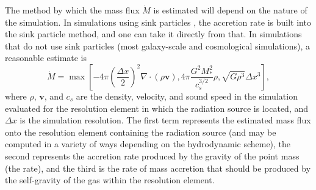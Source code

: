 \documentclass[useAMS,usenatbib]{mn2e}
\begin{document}
The method by which the mass flux $\dot{M}$ is estimated will depend on the nature of the simulation. In simulations using sink particles \citep{bate95a, krumholz04a, federrath10a, gong13a}, the accretion rate is built into the sink particle method, and one can take it directly from that. In simulations that do not use sink particles (most galaxy-scale and cosmological simulations), a reasonable estimate is
\begin{equation}
\label{eq:mdot_est}
\dot{M} = \max\left[-4\pi \left(\frac{\Delta x}{2}\right)^2 \nabla\cdot(\rho \mathbf{v}), 
4\pi \frac{G^2 M_*^2}{c_s^{3/2}} \rho, \sqrt{G\rho^3}\Delta x^3 \right],
\end{equation}
where $\rho$, $\mathbf{v}$, and $c_s$ are the density, velocity, and sound speed in the simulation evaluated for the resolution element in which the radiation source is located, and $\Delta x$ is the simulation resolution. The first term represents the estimated mass flux onto the resolution element containing the radiation source (and may be computed in a variety of ways depending on the hydrodynamic scheme), the second represents the accretion rate produced by the gravity of the point mass (the \citet{bondi52a} rate), and the third is the rate of mass accretion that should be produced by the self-gravity of the gas within the resolution element.
\end{document}
